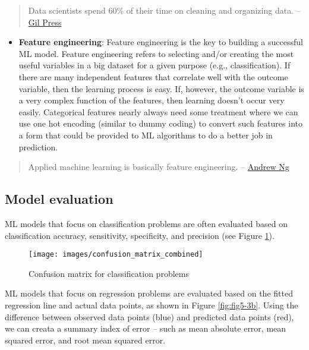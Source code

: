\documentclass[
]{book}
\providecommand{\tightlist}{%
  \setlength{\itemsep}{0pt}\setlength{\parskip}{0pt}}
\begin{document}
\begin{quote}
Data scientists spend 60\% of their time on cleaning and organizing data. -- \href{https://www.forbes.com/sites/gilpress/2016/03/23/data-preparation-most-time-consuming-least-enjoyable-data-science-task-survey-says/\#7dfde9af6f63}{Gil Press}
\end{quote}

\begin{itemize}
\tightlist
\item
  \textbf{Feature engineering}: Feature engineering is the key to building a successful ML model. Feature engineering refers to selecting and/or creating the most useful variables in a big dataset for a given purpose (e.g., classification). If there are many independent features that correlate well with the outcome variable, then the learning process is easy. If, however, the outcome variable is a very complex function of the features, then learning doesn't occur very easily. Categorical features nearly always need some treatment where we can use one hot encoding (similar to dummy coding) to convert such features into a form that could be provided to ML algorithms to do a better job in prediction.
\end{itemize}

\begin{quote}
Applied machine learning is basically feature engineering. -- \href{https://en.wikipedia.org/wiki/Andrew_Ng}{Andrew Ng}
\end{quote}

\hypertarget{model-evaluation}{%
\subsection{Model evaluation}\label{model-evaluation}}

ML models that focus on classification problems are often evaluated based on classification accuracy, sensitivity, specificity, and precision (see Figure \ref{fig:fig5-3a}).

\begin{figure}
\texttt{[image: images/confusion\_matrix\_combined]} \caption{Confusion matrix for classification problems}\label{fig:fig5-3a}
\end{figure}

ML models that focus on regression problems are evaluated based on the fitted regression line and actual data points, as shown in Figure \ref{fig:fig5-3b}. Using the difference between observed data points (blue) and predicted data points (red), we can creata a summary index of error -- such as mean absolute error, mean squared error, and root mean squared error.
\end{document}
